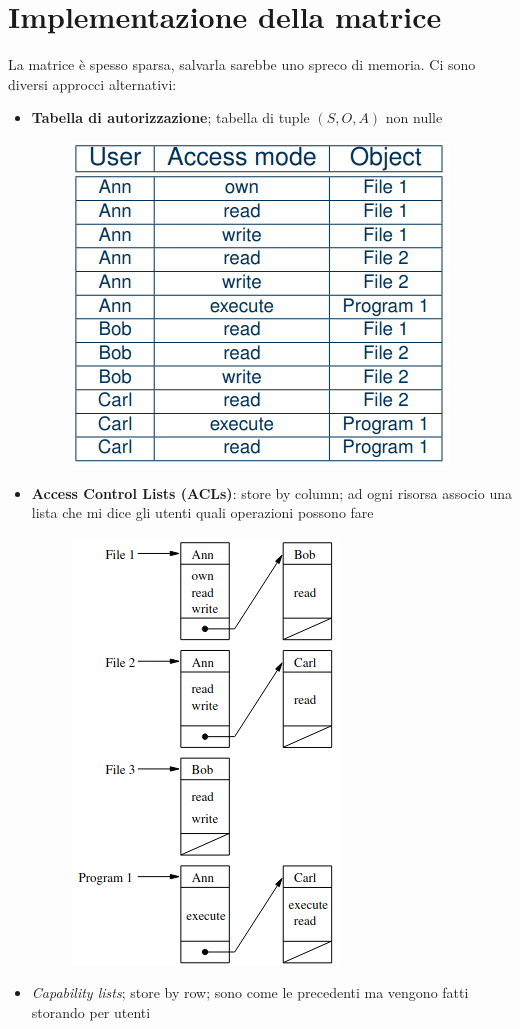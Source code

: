 \documentclass{report}
\begin{document}
\section{Implementazione della matrice}
La matrice è spesso sparsa, salvarla sarebbe uno spreco di memoria. Ci sono diversi 
approcci alternativi:
\begin{itemize}
    \item \textbf{Tabella di autorizzazione}; tabella di tuple $(S, O, A)$ non nulle
    \begin{figure}[H]
        \centering
        \includegraphics[width=0.5\linewidth]{images/auth-table.png}
    \end{figure}
    \newpage
    \item \textbf{Access Control Lists (ACLs)}: store by column; ad ogni risorsa associo una lista 
    che mi dice gli utenti quali operazioni possono fare
    \begin{figure}[H]
        \centering
        \includegraphics[width=0.4\linewidth]{images/acl.png}
    \end{figure}
    \item \textit{Capability lists}; store by row; sono come le precedenti ma vengono fatti storando per utenti

\end{itemize}
\end{document}
